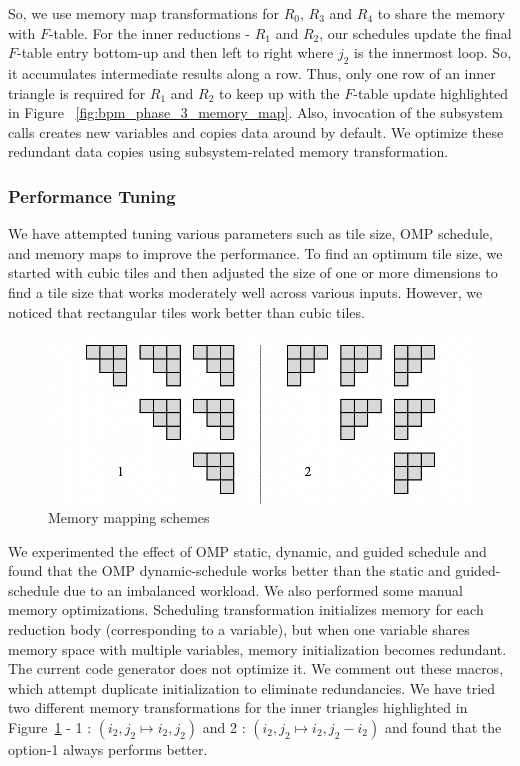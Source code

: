 So, we use memory map transformations for $R_{0}$, $R_{3}$ and $R_{4}$ to share the memory with $F$-table. For the inner reductions - $R_{1}$ and $R_{2}$, our schedules update the final $F$-table entry bottom-up and then left to right where $j_{2}$ is the innermost loop. So, it accumulates intermediate results along a row. Thus, only one row of an inner triangle is required for $R_{1}$ and $R_{2}$ to keep up with the $F$-table update highlighted in Figure ~\ref{fig:bpm_phase_3_memory_map}.  Also, invocation of the subsystem calls creates new variables and copies data around by default. We optimize these redundant data copies using subsystem-related memory transformation.

\subsubsection{Performance Tuning}
We have attempted tuning various parameters such as tile size, OMP schedule, and memory maps to improve the performance. To find an optimum tile size, we started with cubic tiles and then adjusted the size of one or more dimensions to find a  tile size that works moderately well across various inputs. However,  we noticed that rectangular tiles work better than cubic tiles. 
\begin{figure}[htbp]
\centerline{\includegraphics[scale=0.70, trim=5 5 5 5,clip]{content/figures/memory_map_update.png}}
\caption{Memory mapping schemes}
\label{fig:memory_map_schemes}
\end{figure}
We experimented the effect of OMP static, dynamic, and guided schedule and found that the OMP dynamic-schedule works better than the static and guided-schedule due to an imbalanced workload. We also performed some manual memory optimizations.  Scheduling transformation initializes memory for each reduction body (corresponding to a variable), but when one variable shares memory space with multiple variables,  memory initialization becomes redundant. The current code generator does not optimize it. We comment out these macros, which attempt duplicate initialization to eliminate redundancies. We have tried two different memory transformations for the inner triangles highlighted in  Figure~\ref{fig:memory_map_schemes} - 1 : $(i_{2}, j_{2} \mapsto i_{2}, j_{2})$ and 2 : $(i_{2}, j_{2} \mapsto i_{2}, j_{2}-i_{2})$ and found that the option-1 always performs better.

